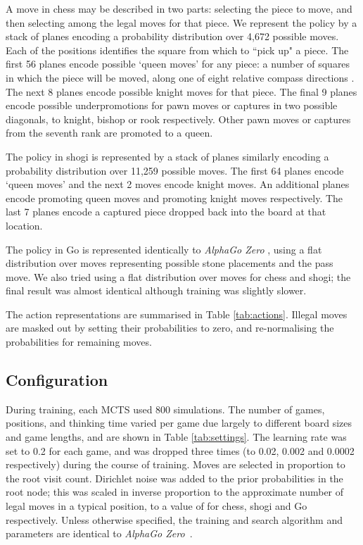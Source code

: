 \documentclass[12pt]{article}
\begin{document}
A move in chess may be described in two parts: selecting the piece to move, and then selecting among the legal moves for that piece. We represent the policy  by a  stack of planes encoding a probability distribution over 4,672 possible moves. Each of the  positions identifies the square from which to ``pick up" a piece. The first 56 planes encode possible `queen moves' for any piece: a number of squares  in which the piece will be moved, along one of eight relative compass directions . The next 8 planes encode possible knight moves for that piece. The final 9 planes encode possible underpromotions for pawn moves or captures in two possible diagonals, to knight, bishop or rook respectively. Other pawn moves or captures from the seventh rank are promoted to a queen. 

The policy in shogi is represented by a  stack of planes similarly encoding a probability distribution over 11,259 possible moves. The first 64 planes encode `queen moves' and the next 2 moves encode knight moves. An additional  planes encode promoting queen moves and promoting knight moves respectively. The last 7 planes encode a captured piece dropped back into the board at that location. 

The policy in Go is represented identically to \emph{AlphaGo Zero} \cite{Silver17AG0}, using a flat distribution over  moves representing possible stone placements and the pass move. 
We also tried using a flat distribution over moves for chess and shogi; the final result was almost identical although training was slightly slower. 

The action representations are summarised in Table \ref{tab:actions}. Illegal moves are masked out by setting their probabilities to zero, and re-normalising the probabilities for remaining moves.

\subsection*{Configuration}

During training, each MCTS used 800 simulations. The number of games, positions, and thinking time varied per game due largely to different board sizes and game lengths, and are shown in Table \ref{tab:settings}. The learning rate was set to 0.2 for each game, and was dropped three times (to 0.02, 0.002 and 0.0002 respectively) during the course of training. Moves are selected in proportion to the root visit count. Dirichlet noise  was added to the prior probabilities in the root node; this was scaled in inverse proportion to the approximate number of legal moves in a typical position, to a value of  for chess, shogi and Go respectively. Unless otherwise specified, the training and search algorithm and parameters are identical to \emph{AlphaGo Zero}~\cite{Silver17AG0}.
\end{document}
